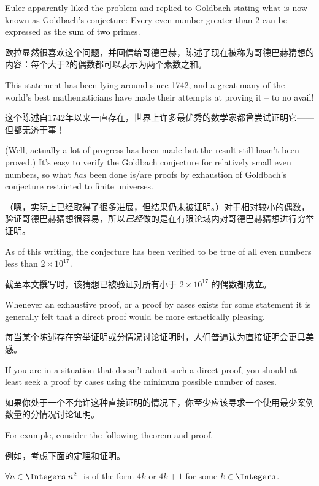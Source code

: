 Euler apparently liked the 
problem and replied to Goldbach stating what is now known as Goldbach's 
conjecture: Every even number greater than 2 can be expressed as the sum of
two primes.

欧拉显然很喜欢这个问题，并回信给哥德巴赫，陈述了现在被称为哥德巴赫猜想的内容：每个大于2的偶数都可以表示为两个素数之和。

This statement has been lying around since 1742, and a great
many of the world's best mathematicians have made their attempts at proving it
-- to no avail!

这个陈述自1742年以来一直存在，世界上许多最优秀的数学家都曾尝试证明它——但都无济于事！

(Well, actually a lot of progress has been made but the result
still hasn't been proved.)  It's easy to verify the Goldbach conjecture for
relatively small even numbers, so what \emph{has} been done is/are proofs by
exhaustion of Goldbach's conjecture restricted to finite universes.

（嗯，实际上已经取得了很多进展，但结果仍未被证明。）对于相对较小的偶数，验证哥德巴赫猜想很容易，所以\emph{已经}做的是在有限论域内对哥德巴赫猜想进行穷举证明。

As of this writing, the conjecture has been verified to be true of
all even numbers less than $2 \times 10^{17}$.

截至本文撰写时，该猜想已被验证对所有小于 $2 \times 10^{17}$ 的偶数都成立。

Whenever an exhaustive proof, or a proof by cases exists for some statement
it is generally felt that a direct proof would be more esthetically pleasing.

每当某个陈述存在穷举证明或分情况讨论证明时，人们普遍认为直接证明会更具美感。

If you are in a situation that doesn't admit such a direct proof, you should
at least seek a proof by cases using the minimum possible number of cases.

如果你处于一个不允许这种直接证明的情况下，你至少应该寻求一个使用最少案例数量的分情况讨论证明。

For example, consider the following theorem and proof.

例如，考虑下面的定理和证明。

\begin{thm} $\forall n \in \Integers \; n^2 \;$ is of the form $4k$ or 
$4k+1$ for some $k \in \Integers$.
\end{thm}

